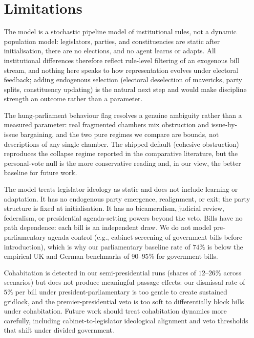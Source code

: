 \documentclass[11pt]{article}
\begin{document}
\section{Limitations}
\label{sec:limitations}

The model is a stochastic pipeline model of institutional rules, not a
dynamic population model: legislators, parties, and constituencies are
static after initialisation, there are no elections, and no agent learns or
adapts. All institutional differences therefore reflect rule-level filtering
of an exogenous bill stream, and nothing here speaks to how representation
evolves under electoral feedback; adding endogenous selection (electoral
deselection of mavericks, party splits, constituency updating) is the
natural next step and would make discipline strength an outcome rather than
a parameter.

The hung-parliament behaviour flag resolves a genuine ambiguity rather than
a measured parameter: real fragmented chambers mix obstruction and
issue-by-issue bargaining, and the two pure regimes we compare are bounds,
not descriptions of any single chamber. The shipped default (cohesive
obstruction) reproduces the collapse regime reported in the comparative
literature, but the personal-vote null is the more conservative reading and,
in our view, the better baseline for future work.

The model treats legislator ideology as static and does not include
learning or adaptation. It has no endogenous party emergence, realignment,
or exit; the party structure is fixed at initialisation. It has no
bicameralism, judicial review, federalism, or presidential agenda-setting
powers beyond the veto. Bills have no path dependence: each bill is an
independent draw. We do not model pre-parliamentary agenda control (e.g.,
cabinet screening of government bills before introduction), which is why
our parliamentary baseline rate of $74\%$ is below the empirical UK and
German benchmarks of $90$--$95\%$ for government bills.

Cohabitation is detected in our semi-presidential runs (shares of
$12$--$26\%$ across scenarios) but does not produce meaningful passage
effects: our dismissal rate of $5\%$ per bill under president-parliamentary
is too gentle to create sustained gridlock, and the premier-presidential
veto is too soft to differentially block bills under
cohabitation. Future work should treat cohabitation dynamics more carefully,
including cabinet-to-legislator ideological alignment and veto thresholds
that shift under divided government.
\end{document}

